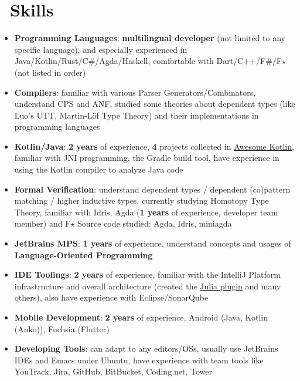 \documentclass{resume}
\begin{document}
\section{\faCogs\ Skills}
\begin{itemize}[parsep=0.25ex]
  \item \textbf{Programming Languages}:
    \textbf{multilingual developer} (not limited to any specific language),
    and especially experienced in Java/Kotlin/Rust/C\#/Agda/Haskell,
    comfortable with Dart/C++/F\#/F$\star$ (not listed in order)

  \item \textbf{Compilers}:
    familiar with various Parser Generators/Combinators,
    understand CPS and ANF, studied some
    theories about dependent types (like Luo's UTT, Martin-Löf Type Theory)
    and their implementations in programming languages

  \item \textbf{Kotlin/Java}:
    \textbf{2 years} of experience,
    \textbf{4} projects collected in
    \href{https://kotlin.link/?q=ice} {Awesome Kotlin},
    familiar with JNI programming, the Gradle build tool, have experience
    in using the Kotlin compiler to analyze Java code

  \item \textbf{Formal Verification}:
    understand dependent types / dependent (co)pattern matching /
    higher inductive types, currently studying Homotopy Type Theory,
    familiar with Idris, Agda (\textbf{1 years} of experience,
    developer team member) and F$\star$
    \subitem Source code studied: Agda, Idris, miniagda

  \item \textbf{JetBrains MPS}:
    \textbf{1 years} of experience,
    understand concepts and usages of \textbf{Language-Oriented Programming}

  \item \textbf{IDE Toolings}:
    \textbf{2 years} of experience,
    familiar with the IntelliJ Platform infrastructure and overall
    architecture (created the
    \href{https://plugins.jetbrains.com/plugin/10413-julia}
         {Julia plugin} and many others), also have experience with Eclipse/SonarQube

  \item \textbf{Mobile Development}:
    \textbf{2 years} of experience,
    Android (Java, Kotlin (Anko)), Fuchsia (Flutter)

  \item \textbf{Developing Tools}:
    can adapt to any editors/OSs, usually use JetBrains IDEs and Emacs under Ubuntu,
    have experience with team tools like YouTrack, Jira, GitHub, BitBucket, Coding.net, Tower
\end{itemize}
\end{document}
